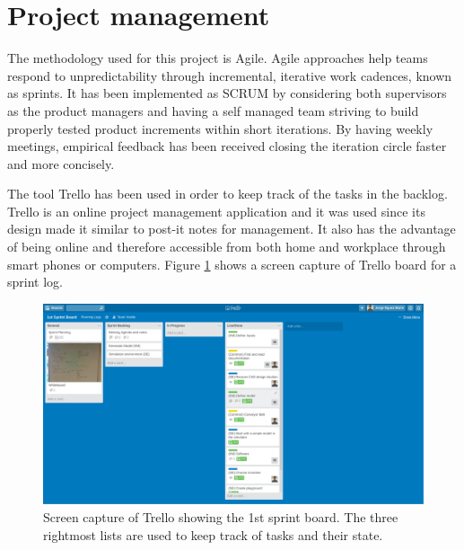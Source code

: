 \section{Project management} %
\label{sec:project_management}
The methodology used for this project is Agile.
Agile approaches help teams respond to unpredictability through incremental, iterative work cadences, known as sprints.
It has been implemented as SCRUM \cite{singh2008u} by considering both supervisors as the product managers and having a self managed team striving to build properly tested product increments within short iterations.
By having weekly meetings, empirical feedback has been received closing the iteration circle faster and more concisely.

The tool Trello \cite{trello} has been used in order to keep track of the tasks in the backlog.
Trello is an online project management application and it was used since its design made it similar to post-it notes for management.
It also has the advantage of being online and therefore accessible from both home and workplace through smart phones or computers.
Figure \ref{fig:trello} shows a screen capture of Trello board for a sprint log.

\begin{figure}[ht]
  \centering
  \includegraphics[width=\textwidth]{figures/trello.png}
  \caption{Screen capture of Trello showing the 1st sprint board. The three
rightmost lists are used to keep track of tasks and their state.}
  \label{fig:trello}
\end{figure}

